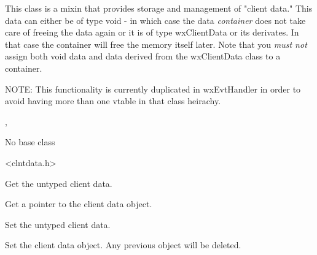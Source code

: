 This class is a mixin that provides storage and management of "client
data." This data can either be of type void - in which case the data
{\it container} does not take care of freeing the data again
or it is of type wxClientData or its derivates. In that case the
container will free the memory itself later.
Note that you {\it must not} assign both void data and data
derived from the wxClientData class to a container.

NOTE: This functionality is currently duplicated in wxEvtHandler in
order to avoid having more than one vtable in that class heirachy.


, 


No base class


<clntdata.h>




\label{wxclientdatacontainerwxclientdatacontainer}



\label{wxclientdatacontainerdtor}



\label{wxclientdatacontainergetclientdata}


Get the untyped client data.

\label{wxclientdatacontainergetclientobject}


Get a pointer to the client data object.

\label{wxclientdatacontainersetclientdata}


Set the untyped client data.

\label{wxclientdatacontainersetclientobject}


Set the client data object. Any previous object will be deleted.

